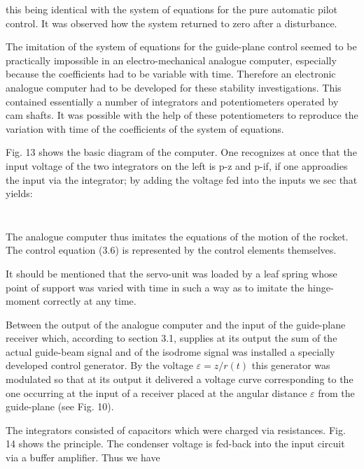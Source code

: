 \documentclass[12pt, a4paper]{article}
\begin{document}
this being identical with the system of equations for the pure automatic pilot control. It was observed how the system returned to zero after a disturbance.

The imitation of the system of equations for the guide-plane control seemed to be practically impossible in an electro-mechanical analogue computer, especially because the coefficients had to be variable with time. Therefore an electronic analogue computer had to be developed for these stability investigations. This contained essentially a number of integrators and potentiometers operated by cam shafts. It was possible with the help of these potentiometers to reproduce the variation with time of the coefficients of the system of equations.

Fig. 13 shows the basic diagram of the computer. One recognizes at once that the input voltage of the two integrators on the left is p-z and p-if, if one approadies the input via the integrator; by adding the voltage fed into the inputs we sec that yields:

\begin{equation}
\end{equation}

\begin{equation}
\end{equation}

The analogue computer thus imitates the equations of the motion of the rocket. The control equation (3.6) is represented by the control elements themselves.

It should be mentioned that the servo-unit was loaded by a leaf spring whose point of support was varied with time in such a way as to imitate the hinge-moment correctly at any time.

Between the output of the analogue computer and the input of the guide-plane receiver which, according to section 3.1, supplies at its output the sum of the actual guide-beam signal and of the isodrome signal was installed a specially developed control generator. By the voltage $\varepsilon=z/r(t)$ this generator was modulated so that at its output it delivered a voltage curve corresponding to the one occurring at the input of a receiver placed at the angular distance $\varepsilon$ from the guide-plane (see Fig. 10).

The integrators consisted of capacitors which were charged via resistances. Fig. 14 shows the principle. The condenser voltage is fed-back into the input circuit via a buffer amplifier. Thus we have
\end{document}
